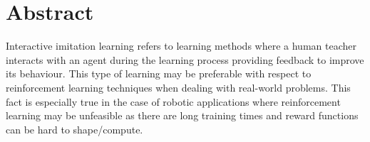 \chapter*{Abstract}





Interactive imitation learning refers to learning methods where a human teacher interacts with an agent during the learning process providing feedback to improve its behaviour. This type of learning may be preferable with respect to reinforcement learning techniques when dealing with real-world problems. This fact is especially true in the case of robotic applications where reinforcement learning may be unfeasible as there are long training times and reward functions can be hard to shape/compute.



\vspace{3mm} %

